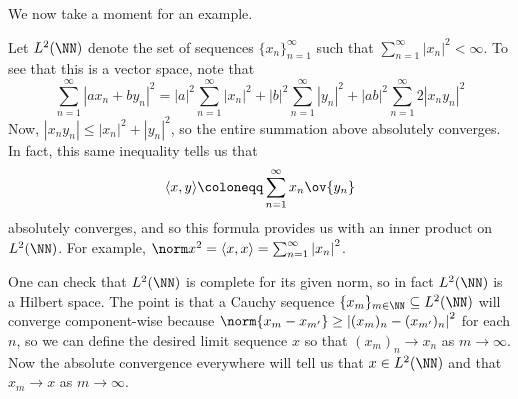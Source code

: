 \documentclass[../notes.tex]{subfiles}
\begin{document}
We now take a moment for an example.
\begin{example}
	Let $L^2(\NN)$ denote the set of sequences $\{x_n\}_{n=1}^\infty$ such that $\sum_{n=1}^\infty\left|x_n\right|^2<\infty$. To see that this is a vector space, note that
	\[\sum_{n=1}^\infty\left|ax_n+by_n\right|^2=\left|a\right|^2\sum_{n=1}^\infty\left|x_n\right|^2+\left|b\right|^2\sum_{n=1}^\infty\left|y_n\right|^2+\left|ab\right|^2\sum_{n=1}^\infty2\left|x_ny_n\right|^2\]
	Now, $\left|x_ny_n\right|\le\left|x_n\right|^2+\left|y_n\right|^2$, so the entire summation above absolutely converges. In fact, this same inequality tells us that
	\[\langle x,y\rangle\coloneqq\sum_{n=1}^\infty x_n\ov{y_n}\]
	absolutely converges, and so this formula provides us with an inner product on $L^2(\NN)$. For example, $\norm x^2=\langle x,x\rangle=\sum_{n=1}^\infty\left|x_n\right|^2$.
\end{example}
\begin{remark}
	One can check that $L^2(\NN)$ is complete for its given norm, so in fact $L^2(\NN)$ is a Hilbert space. The point is that a Cauchy sequence $\{x_m\}_{m\in\NN}\subseteq L^2(\NN)$ will converge component-wise because $\norm{x_m-x_{m'}}\ge\left|(x_m)_n-(x_{m'})_n\right|^2$ for each $n$, so we can define the desired limit sequence $x$ so that $(x_m)_n\to x_n$ as $m\to\infty$. Now the absolute convergence everywhere will tell us that $x\in L^2(\NN)$ and that $x_m\to x$ as $m\to\infty$.
\end{remark}
\end{document}

